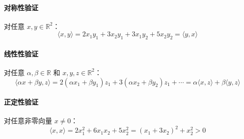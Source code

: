\paragraph{对称性验证}  
对任意 \(x, y \in \mathbb{R}^2\)：
\[
\langle x, y \rangle = 2x_1y_1 + 3x_2y_1 + 3x_1y_2 + 5x_2y_2 = \langle y, x \rangle
\]

\paragraph{线性性验证}  
对任意 \(\alpha, \beta \in \mathbb{R}\) 和 \(x, y, z \in \mathbb{R}^2\)：
\[
\langle \alpha x + \beta y, z \rangle = 2(\alpha x_1 + \beta y_1)z_1 + 3(\alpha x_2 + \beta y_2)z_1 + \cdots = \alpha \langle x, z \rangle + \beta \langle y, z \rangle
\]

\paragraph{正定性验证}  
对任意非零向量 \(x \neq 0\)：
\[
\langle x, x \rangle = 2x_1^2 + 6x_1x_2 + 5x_2^2 = (x_1 + 3x_2)^2 + x_2^2 > 0
\]